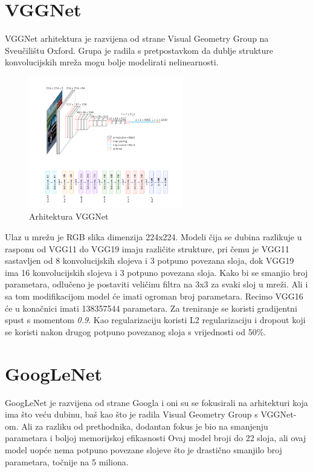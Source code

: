 \section{VGGNet}\label{sec:vggnet}
VGGNet arhitektura je razvijena od strane Visual Geometry Group na Sveučilištu Oxford.
Grupa je radila s pretpostavkom da dublje strukture konvolucijskih mreža mogu bolje modelirati nelinearnosti.

\FloatBarrier
\begin{figure}[h]
    \centering
    \includegraphics[width=0.6\textwidth]{images/VGGNet}
    \caption{Arhitektura VGGNet
    \protect\footnotemark}
    \label{fig:slika10}
\end{figure}
\FloatBarrier
{}
Ulaz u mrežu je RGB slika dimenzija 224x224.
Modeli čija se dubina razlikuje u rasponu od VGG11 do VGG19 imaju različite strukture, pri čemu je VGG11 sastavljen od 8 konvolucijskih slojeva i 3 potpuno povezana sloja, dok VGG19 ima 16 konvolucijskih slojeva i 3 potpuno povezana sloja.
Kako bi se smanjio broj parametara, odlučeno je postaviti veličinu filtra na 3x3 za svaki sloj u mreži.
Ali i sa tom modifikacijom model će imati ogroman broj parametara.
Recimo VGG16 će u konačnici imati 138357544 parametara.
Za treniranje se koristi gradijentni spust s momentom \emph{0.9}.
Kao regularizaciju koristi L2 regularizaciju i dropout koji se koristi nakon drugog potpuno povezanog sloja s vrijednosti od 50\%.

\section{GoogLeNet}\label{sec:googlenet}
GoogLeNet je razvijena od strane Googla i oni su se fokusirali na arhitekturi koja ima što veću dubinu, baš kao što je radila Visual Geometry Group s VGGNet-om.
Ali za razliku od prethodnika, dodantan fokus je bio na smanjenju parametara i boljoj memorijskoj efikasnosti
Ovaj model broji do 22 sloja, ali ovaj model uopće nema potpuno povezane slojeve što je drastično smanjilo broj parametara, točnije na 5 miliona.

